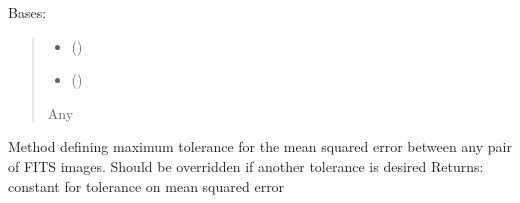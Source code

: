 \documentclass[letterpaper,10pt,english]{sphinxmanual}
\begin{document}
\begin{fulllineitems}
\label{\detokenize{api/TestHarness.LongAcceptanceTests:TestHarness.LongAcceptanceTests.TestLOFAR_J1329_p4729.TestLOFAR_J1329_p4729}}
\pysigstartsignatures
{}
\pysigstopsignatures
\sphinxAtStartPar
Bases: 
\begin{quote}\begin{description}
\begin{itemize}
\item {} 
\sphinxAtStartPar
{} () \textendash{} 

\item {} 
\sphinxAtStartPar
{} () \textendash{} 

\end{itemize}

\sphinxAtStartPar
Any

\end{description}\end{quote}

\begin{fulllineitems}
\label{\detokenize{api/TestHarness.LongAcceptanceTests:TestHarness.LongAcceptanceTests.TestLOFAR_J1329_p4729.TestLOFAR_J1329_p4729.defMeanSquaredErrorLevel}}
\pysigstartsignatures
{}
\pysigstopsignatures
\sphinxAtStartPar
Method defining maximum tolerance for the mean squared error between any
pair of FITS images. Should be overridden if another tolerance is
desired
Returns:
constant for tolerance on mean squared error

\end{fulllineitems}


\end{fulllineitems}
\end{document}
